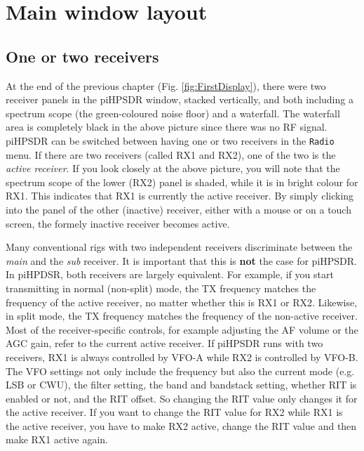 \documentclass[12pt]{book}
\begin{document}
\chapter{Main window layout}

\section{One or two receivers}
At the end of the previous chapter (Fig. \ref{fig:FirstDisplay}),
 there were two receiver panels in the
piHPSDR window, stacked vertically, and both including a spectrum scope
(the green-coloured noise floor) and a waterfall. The waterfall area
is completely black in the above picture since there was no RF signal.
piHPSDR can be switched between having one or two receivers in the
\texttt{Radio} menu. If there are two receivers (called RX1 and RX2),
 one of the two is the \textit{active receiver}. If you look closely
 at the above picture, you will note that the spectrum scope of
 the lower (RX2) panel is shaded, while it is in bright colour for RX1.
 This indicates that RX1 is currently the active receiver. By simply
 clicking into the panel of the other (inactive) receiver, either with
 a mouse or on a touch screen, the formely inactive receiver becomes
 active.
 
 Many conventional rigs with two independent receivers discriminate
 between the \textit{main} and the \textit{sub} receiver. It is important that
 this is \textbf{not} the case for piHPSDR. In piHPDSR, both  receivers are
 largely equivalent. For example, if you start transmitting in
 normal (non-split) mode, the TX frequency matches the frequency
 of the active receiver, no matter whether this is RX1 or RX2.
 Likewise, in split mode, the TX frequency matches the frequency
 of the non-active receiver. Most of the receiver-specific controls,
 for example adjusting the AF volume or the AGC gain, refer to the
 current active receiver. If piHPSDR runs with two receivers,
 RX1 is always controlled by VFO-A while RX2 is controlled by VFO-B.
 The VFO settings not only include the frequency but also the
 current mode (e.g. LSB or CWU), the filter setting, the band and
 bandstack setting, whether RIT is enabled or not, and the RIT
 offset. So changing the RIT value only changes it for the active
 receiver. If you want  to change the RIT value for RX2 while RX1 is
 the active receiver, you have to make RX2 active, change the RIT
 value and then make RX1 active again.
 
\end{document}
